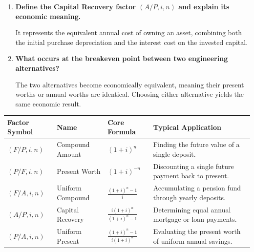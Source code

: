\documentclass[12pt,a4paper]{article}
\newcommand{\Q}[1]{\textbf{#1}\par\noindent\ignorespaces}
\renewcommand{\arraystretch}{1.45}
\begin{document}
\begin{tcolorbox}[exambox, title={\textbf{Frequently Asked / Viva Questions}}]
\begin{enumerate}[topsep=0pt, label=\textbf{Q\arabic*.}, itemsep=5pt]
  \item \Q{Define the Capital Recovery factor $(A/P, i, n)$ and explain its economic meaning.}
    It represents the equivalent annual cost of owning an asset, combining both the initial purchase depreciation and the interest cost on the invested capital.
  \item \Q{What occurs at the breakeven point between two engineering alternatives?}
    The two alternatives become economically equivalent, meaning their present worths or annual worths are identical. Choosing either alternative yields the same economic result.
\end{enumerate}
\end{tcolorbox}

\begin{tcolorbox}[tikzbox, title={Comparison of TVM Factors and Operations}]
\renewcommand{\arraystretch}{1.45}
\par\noindent
\begin{tabularx}{\linewidth}{|B{2.3cm}|Y|Y|Y|}
\hline
\textbf{Factor Symbol} & \textbf{Name} & \textbf{Core Formula} & \textbf{Typical Application} \\
\hline
\textbf{$(F/P, i, n)$} & Compound Amount & $(1+i)^n$ & Finding the future value of a single deposit. \\
\hline
\textbf{$(P/F, i, n)$} & Present Worth & $(1+i)^{-n}$ & Discounting a single future payment back to present. \\
\hline
\textbf{$(F/A, i, n)$} & Uniform Compound & $\displaystyle\frac{(1+i)^n - 1}{i}$ & Accumulating a pension fund through yearly deposits. \\
\hline
\textbf{$(A/P, i, n)$} & Capital Recovery & $\displaystyle\frac{i(1+i)^n}{(1+i)^n - 1}$ & Determining equal annual mortgage or loan payments. \\
\hline
\textbf{$(P/A, i, n)$} & Uniform Present & $\displaystyle\frac{(1+i)^n - 1}{i(1+i)^n}$ & Evaluating the present worth of uniform annual savings. \\
\hline
\end{tabularx}
\end{tcolorbox}
\end{document}
